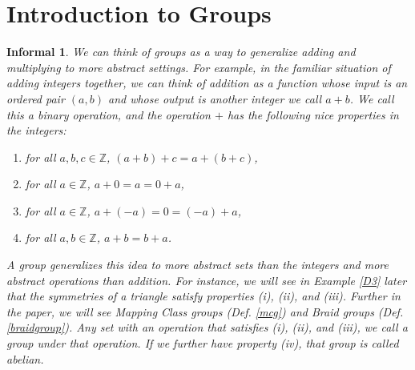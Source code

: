\documentclass{amsart}
\newtheorem*{informal}{Informal}
\begin{document}
\section{Introduction to Groups}\label{intro-to-groups}
\begin{definition}\label{groups}
   \begin{informal}
      We can think of groups as a way to generalize adding and
		multiplying to more abstract settings. For example, in the familiar
		situation of adding integers together, we can think of addition as a
		function whose input is	an ordered pair \((a, b)\) and whose output is
		another integer we call \(a + b\). We call this a \emph{binary
		operation}, and the operation	\(+\) has the following nice properties in
		the integers:

		\begin{enumerate}[label=(\roman*)]
			\item for all \(a, b, c\in\mathbb{Z}\), \((a + b) + c = a +
			(b + c)\),
			\item for all \(a\in \mathbb{Z}\), \(a + 0 = a = 0 + a\),
			\item for all \(a\in\mathbb{Z}\), \(a + (-a) = 0 = (-a) + a\),
			\item for all \(a, b\in\mathbb{Z}\), \(a + b = b + a\).
		\end{enumerate}

		A group generalizes this idea to more abstract sets than the integers
		and more abstract operations than addition. For instance, we will see in
		Example \ref{D3} later that the symmetries
		of a triangle satisfy properties (i), (ii), and (iii). Further
		in the paper, we will see Mapping Class groups (Def. \ref{mcg}) and Braid
		groups
		(Def. \ref{braidgroup}). Any set
		with an operation that satisfies (i), (ii), and (iii), we call a
		\emph{group} under
		that operation. If we further have property (iv), that group is called
		\emph{abelian}.
	\end{informal} 


\end{definition}
\end{document}
